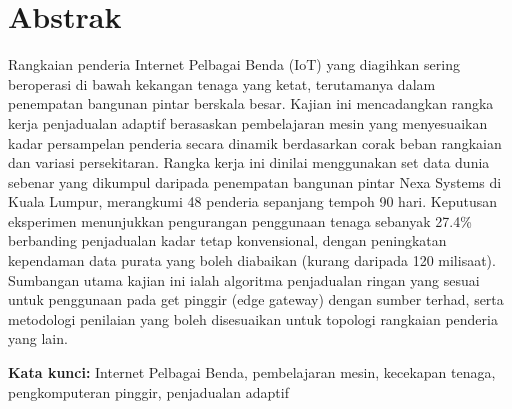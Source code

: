 \chapter*{Abstrak}

Rangkaian penderia Internet Pelbagai Benda (IoT) yang diagihkan sering beroperasi di bawah kekangan
tenaga yang ketat, terutamanya dalam penempatan bangunan pintar berskala besar. Kajian ini
mencadangkan rangka kerja penjadualan adaptif berasaskan pembelajaran mesin yang menyesuaikan
kadar persampelan penderia secara dinamik berdasarkan corak beban rangkaian dan variasi persekitaran.
Rangka kerja ini dinilai menggunakan set data dunia sebenar yang dikumpul daripada penempatan
bangunan pintar Nexa Systems di Kuala Lumpur, merangkumi 48 penderia sepanjang tempoh 90 hari.
Keputusan eksperimen menunjukkan pengurangan penggunaan tenaga sebanyak 27.4\% berbanding
penjadualan kadar tetap konvensional, dengan peningkatan kependaman data purata yang boleh diabaikan
(kurang daripada 120 milisaat). Sumbangan utama kajian ini ialah algoritma penjadualan ringan yang
sesuai untuk penggunaan pada get pinggir (edge gateway) dengan sumber terhad, serta metodologi
penilaian yang boleh disesuaikan untuk topologi rangkaian penderia yang lain.

\medskip
\noindent\textbf{Kata kunci:} Internet Pelbagai Benda, pembelajaran mesin, kecekapan tenaga,
pengkomputeran pinggir, penjadualan adaptif

